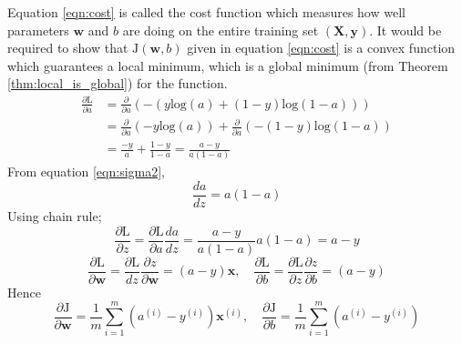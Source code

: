 \documentclass[12pt]{report}
\numberwithin{equation}{section}
\begin{document}
Equation \eqref{eqn:cost} is called the {cost function} which measures how well parameters $\bm{w}$ and $b$ are doing on the entire training set $(\bm{X},\bm{y})$. It would be required to show that $\mathrm{J}(\bm{w},b)$ given in equation \eqref{eqn:cost} is a convex function which guarantees a local minimum, which is a global minimum (from Theorem \ref{thm:local_is_global}) for the function. 
\begin{equation}
\begin{split}
\frac{\partial \mathrm{L}}{\partial a} &=
   \frac{\partial}{\partial a} \left ( - \left( y \text{log}(a) + (1-y)\text{log}(1-a)\right) \right ) \\ 
   &= \frac{\partial}{\partial a} \left ( - y \text{log} (a) \right ) +  \frac{\partial}{\partial a} \left (- (1-y)\text{log}(1-a) \right ) \\
   &=\frac{-y}{a} + \frac{1-y}{1-a} = \frac{a-y}{a(1-a)}
\end{split}
\end{equation}
From equation \eqref{eqn:sigma2}, 
\[ \frac{da}{dz} = a(1-a) \]
Using chain rule;
\begin{equation}\label{eqn:dldz}
\frac{\partial \mathrm{L}}{\partial z} = \frac{\partial \text{L}}{\partial a} \frac{d a}{d z} = \frac{a-y}{a(1-a)}a(1-a) = a-y  
\end{equation}
\[ \frac{\partial \mathrm{L}}{\partial \bm{w}} =
   \frac{\partial \mathrm{L}}{d z} \frac{\partial z}{\partial \bm{w}} = (a - y)\bm{x}, \quad
   \frac{\partial \text{L}}{\partial b} =
   \frac{\partial \text{L}}{\partial z} \frac{\partial z}{\partial b} = (a - y)
\]
Hence 
\begin{equation}\label{eqn:djdz}
\frac{\partial \mathrm{J}}{\partial \bm{w}} = \frac{1}{m}\sum_{i=1}^{m} (a^{(i)} - y^{(i)})\bm{x}^{(i)}, \quad \frac{\partial \mathrm{J}}{\partial b} = \frac{1}{m}\sum_{i=1}^{m} (a^{(i)} - y^{(i)})
\end{equation}
\end{document}
